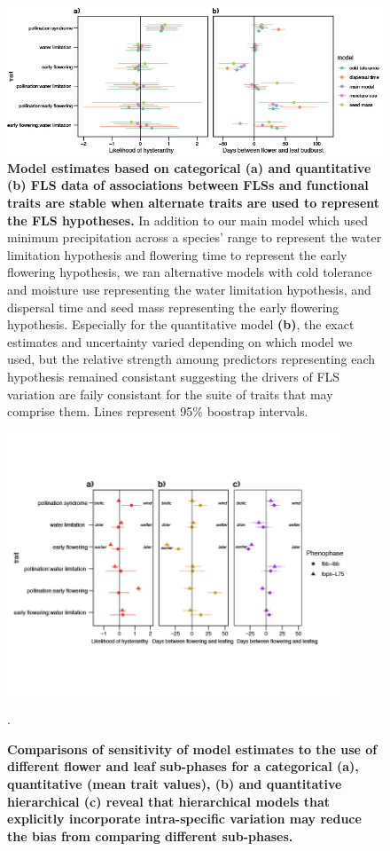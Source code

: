 \documentclass[11pt]{article}\usepackage[]{graphicx}\usepackage[]{color}
\begin{document}
\begin{figure}[H]
\centering
\includegraphics[width=\textwidth]{..//..//alternatepredictors.jpg} 
  \caption{\textbf{Model estimates based on categorical (a) and quantitative (b) FLS data of associations between FLSs and functional traits are stable when alternate traits are used to represent the FLS hypotheses.} In addition to our main model which used minimum precipitation across a species' range to represent the water limitation hypothesis and flowering time to represent the early flowering hypothesis, we ran alternative models with cold tolerance and moisture use representing the water limitation hypothesis, and dispersal time and seed mass representing the early flowering hypothesis. Especially for the quantitative model \textbf{(b)}, the exact estimates and uncertainty varied depending on which model we used, but the relative strength amoung predictors representing each hypothesis remained consistant suggesting the drivers of FLS variation are faily consistant for the suite of traits that may comprise them. Lines represent 95\% boostrap intervals.} 
    \label{fig:altpreds}
    \end{figure}
    
\begin{figure}[H]
\centering
\includegraphics[width=0.9\textwidth]{..//..//HFmodelplots4SUPP-01.jpg} 
  \caption{\textbf{Comparisons of sensitivity of model estimates to the use of different flower and leaf sub-phases for a categorical  \textbf{(a)}, quantitative (mean trait values), \textbf{(b)} and quantitative hierarchical \textbf{(c)} reveal that hierarchical models that explicitly incorporate intra-specific variation may reduce the bias from comparing different sub-phases.}}. 
    \label{fig:sensitivity}
    \end{figure}
\end{document}
